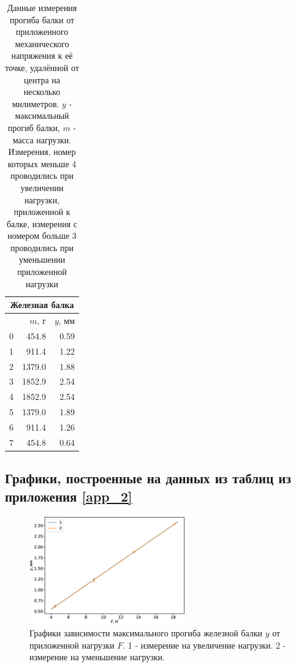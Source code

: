 \documentclass[12pt]{article}
\begin{document}
\begin{table}[H]
    \centering
    \begin{tabular}{|r|r|r|}
        \hline
        \multicolumn{3}{|c|}{Железная балка} \\
        \hline
          & $m$, г & $y$, мм                 \\
        \hline
        0 & 454.8  & 0.59                    \\
        1 & 911.4  & 1.22                    \\
        2 & 1379.0 & 1.88                    \\
        3 & 1852.9 & 2.54                    \\
        4 & 1852.9 & 2.54                    \\
        5 & 1379.0 & 1.89                    \\
        6 & 911.4  & 1.26                    \\
        7 & 454.8  & 0.64                    \\
        \hline
    \end{tabular}
    
    \caption{Данные измерения прогиба балки от приложенного механического напряжения к её точке, удалённой от центра на несколько милиметров. $y$ - максимальный прогиб балки,
        $m$ - масса нагрузки. Измерения, номер которых меньше 4 проводились при увеличении нагрузки, приложенной к балке, измерения с номером больше 3 проводились при уменьшении приложенной нагрузки}
    \label{tab:4}
\end{table}

\subsection{Графики, построенные на данных из таблиц из приложения \ref{app_2}} \label{app_3}
\begin{figure}[H]
    \begin{center}
        \includegraphics[width=0.6\textwidth]{groupdown_metal.eps}
    \end{center}
    \caption{Графики зависимости максимального прогиба железной балки $y$ от приложенной нагрузки $F$. 1 - измерение на увеличение нагрузки.
        2 - измерение на уменьшение нагрузки.}
    \label{fig:2}
\end{figure}
\end{document}
